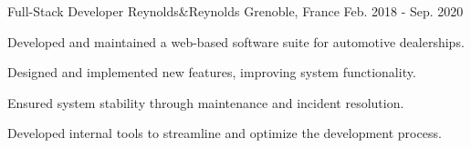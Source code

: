   \cventry
    {Full-Stack Developer} %
    {Reynolds\&Reynolds} %
    {Grenoble, France} %
    {Feb. 2018 - Sep. 2020} %
    {
      \begin{cvitems} %
        \item {Developed and maintained a web-based software suite for automotive dealerships.}
        \item {Designed and implemented new features, improving system functionality.}
        \item {Ensured system stability through maintenance and incident resolution.}
        \item {Developed internal tools to streamline and optimize the development process.}
      \end{cvitems}
    }

